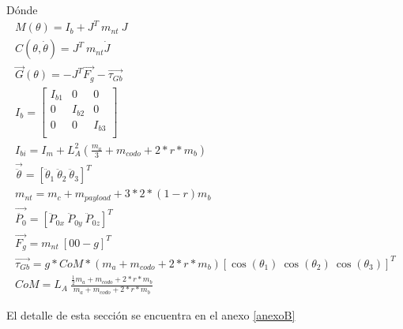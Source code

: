         
        Dónde
        \begin{gather}
                 M \left(  \theta  \right) =I_{b}+J^{T}~m_{nt}~J 
                \label{eq:cap4_MB_26}\\
                 C \left(  \theta ,\dot{ \theta } \right) =J^{T}~m_{nt}\dot{J} 
                 \label{eq:cap4_MB_27}\\
                 \overrightarrow{G} \left(  \theta  \right) =- J^{T}\overrightarrow{F_{g}}-\overrightarrow{ \tau_{Gb}}
                 \label{eq:cap4_MB_28}\\
                I_{b}= \left[ \begin{matrix}
                    I_{b1}  &  0  &  0\\
                    0  &  I_{b2}  &  0\\
                    0  &  0  &  I_{b3}\\
                \end{matrix}\right]  
                \label{eq:cap4_MB_29}\\
                I_{bi}=I_{m}+ L_{A}^{2} \left( \frac{m_{a}}{3}+m_{codo}+2\ast r \ast m_{b} \right) \\
                \overrightarrow{\ddot{ \theta }}= \left[ \ddot{ \theta }_{1}~\ddot{ \theta }_{2}~\ddot{ \theta }_{3}\right] ^{T} 
                \label{eq:cap4_MB_30}\\
                m_{nt}=m_{c}+m_{payload}+3\ast 2 \ast \left( 1-r \right) m_{b} 
                \label{eq:cap4_MB_31}\\
                \overrightarrow{\ddot{P_{0}}}= \left[ \ddot{P}_{0x}~\ddot{P}_{0y}~\ddot{P}_{0z} \right] ^{T} 
                \label{eq:cap4_MB_32}\\
                \overrightarrow{F_{g}}=m_{nt}~ \left[ 0  0  -g \right] ^{T} 
                \label{eq:cap4_MB_33}\\
                \overrightarrow{ \tau_{Gb}}=g \ast CoM\ast \left( m_{a}+m_{codo}+2 \ast r \ast m_{b} \right)  \left[ \cos\left(\theta _{1} \right) ~\cos  \left(  \theta _{2} \right) ~\cos  \left(  \theta _{3} \right)  \right] ^{T} 
                \label{eq:cap4_MB_34}\\
                CoM=L_{A}~\frac{\frac{1}{2} m_{a}+m_{codo}+2 \ast r \ast m_{b}}{m_{a}+m_{codo}+2 \ast r \ast m_{b}}
                \label{eq:cap4_MB_35}
        \end{gather}
        
        El detalle de esta sección se encuentra en el anexo \ref{anexoB}



